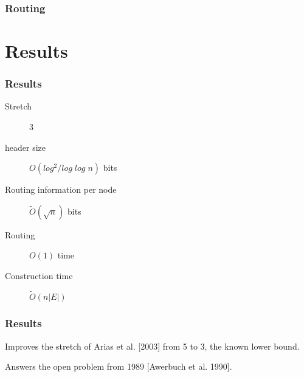 \documentclass[10pt, compress]{beamer}
\begin{document}
\begin{frame}[fragile]
  \frametitle{Routing}


\end{frame}


\section{Results}

\begin{frame}[fragile]
  \frametitle{Results}

  \begin{description}
    \item[Stretch] 3
    \item[header size] $O(log^2/log\;log\;n)$ bits
    \item[Routing information per node] $\tilde{O}(\sqrt{n})$ bits
    \item[Routing] $O(1)$ time
    \item[Construction time] $\tilde{O}(n|E|)$
  \end{description}

\end{frame}

\begin{frame}[fragile]
  \frametitle{Results}
  Improves the stretch of Arias et al. [2003] from 5 to 3, the known lower bound.

  Answers the open problem from 1989 [Awerbuch et al. 1990].

\end{frame}


\end{document}
